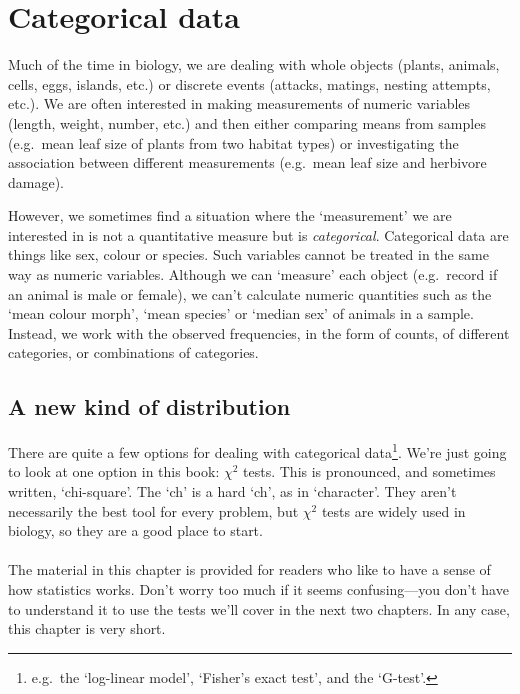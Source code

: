 \documentclass[
]{book}
\newenvironment{greybox}{
  \definecolor{shadecolor}{rgb}{0.95,0.95,0.95}  %
  \color{black}
  \begin{shaded}}
 {\end{shaded}}
\newenvironment{infobox}[1]
  {
  \begin{itemize}
  \renewcommand{\labelitemi}{
    \raisebox{-.7\height}[0pt][0pt]{
      {\setkeys{Gin}{width=3em,keepaspectratio}
        \texttt{[image: images/\#1]}}
    }
  }
  \setlength{\fboxsep}{1em}
  \begin{greybox}
  \item
  }
  {
  \end{greybox}
  \end{itemize}
  }
\begin{document}
\hypertarget{categorical-data-intro-chapter}{%
\chapter{Categorical data}\label{categorical-data-intro-chapter}}

Much of the time in biology, we are dealing with whole objects (plants, animals, cells, eggs, islands, etc.) or discrete events (attacks, matings, nesting attempts, etc.). We are often interested in making measurements of numeric variables (length, weight, number, etc.) and then either comparing means from samples (e.g.~mean leaf size of plants from two habitat types) or investigating the association between different measurements (e.g.~mean leaf size and herbivore damage).

However, we sometimes find a situation where the `measurement' we are interested in is not a quantitative measure but is \emph{categorical}. Categorical data are things like sex, colour or species. Such variables cannot be treated in the same way as numeric variables. Although we can `measure' each object (e.g.~record if an animal is male or female), we can't calculate numeric quantities such as the `mean colour morph', `mean species' or `median sex' of animals in a sample. Instead, we work with the observed frequencies, in the form of counts, of different categories, or combinations of categories.

\hypertarget{a-new-kind-of-distribution}{%
\section{A new kind of distribution}\label{a-new-kind-of-distribution}}

There are quite a few options for dealing with categorical data\footnote{e.g.~the `log-linear model', `Fisher's exact test', and the `G-test'.}. We're just going to look at one option in this book: \(\chi^2\) tests. This is pronounced, and sometimes written, `chi-square'. The `ch' is a hard `ch', as in `character'. They aren't necessarily the best tool for every problem, but \(\chi^2\) tests are widely used in biology, so they are a good place to start.

\begin{infobox}{warning}

\hypertarget{section-18}{%
\subsubsection*{}\label{section-18}}

The material in this chapter is provided for readers who like to have a sense of how statistics works. Don't worry too much if it seems confusing---you don't have to understand it to use the tests we'll cover in the next two chapters. In any case, this chapter is very short.

\end{infobox}
\end{document}
